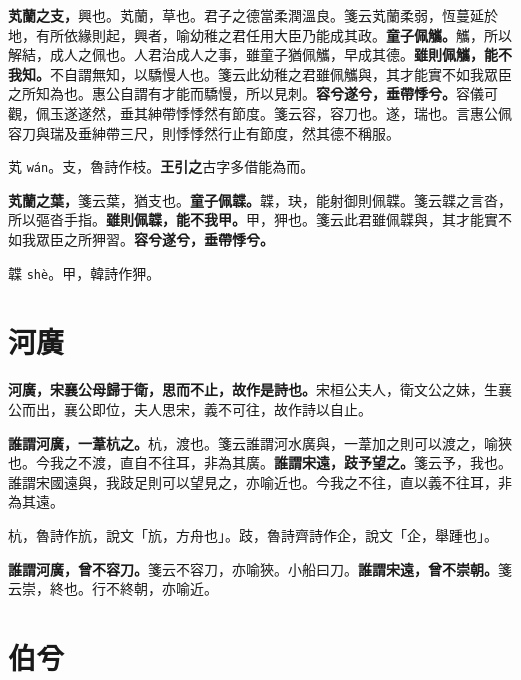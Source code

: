 \textbf{芄蘭之支，}{\footnotesize 興也。芄蘭，草也。君子之德當柔潤溫良。箋云芄蘭柔弱，恆蔓延於地，有所依緣則起，興者，喻幼稚之君任用大臣乃能成其政。}\textbf{童子佩觿。}{\footnotesize 觿，所以解結，成人之佩也。人君治成人之事，雖童子猶佩觿，早成其德。}\textbf{雖則佩觿，能不我知。}{\footnotesize 不自謂無知，以驕慢人也。箋云此幼稚之君雖佩觿與，其才能實不如我眾臣之所知為也。惠公自謂有才能而驕慢，所以見刺。}\textbf{容兮遂兮，垂帶悸兮。}{\footnotesize 容儀可觀，佩玉遂遂然，垂其紳帶悸悸然有節度。箋云容，容刀也。遂，瑞也。言惠公佩容刀與瑞及垂紳帶三尺，則悸悸然行止有節度，然其德不稱服。}

\begin{quoting}芄 \texttt{wán}。支，魯詩作枝。\textbf{王引之}古字多借能為而。\end{quoting}

\textbf{芄蘭之葉，}{\footnotesize 箋云葉，猶支也。}\textbf{童子佩韘。}{\footnotesize 韘，玦，能射御則佩韘。箋云韘之言沓，所以彄沓手指。}\textbf{雖則佩韘，能不我甲。}{\footnotesize 甲，狎也。箋云此君雖佩韘與，其才能實不如我眾臣之所狎習。}\textbf{容兮遂兮，垂帶悸兮。}

\begin{quoting}韘 \texttt{shè}。甲，韓詩作狎。\end{quoting}

\section{河廣}


\textbf{河廣，宋襄公母歸于衛，思而不止，故作是詩也。}{\footnotesize 宋桓公夫人，衛文公之妹，生襄公而出，襄公即位，夫人思宋，義不可往，故作詩以自止。}

\textbf{誰謂河廣，一葦杭之。}{\footnotesize 杭，渡也。箋云誰謂河水廣與，一葦加之則可以渡之，喻狹也。今我之不渡，直自不往耳，非為其廣。}\textbf{誰謂宋遠，跂予望之。}{\footnotesize 箋云予，我也。誰謂宋國遠與，我跂足則可以望見之，亦喻近也。今我之不往，直以義不往耳，非為其遠。}

\begin{quoting}杭，魯詩作斻，說文「斻，方舟也」。跂，魯詩齊詩作企，說文「企，舉踵也」。\end{quoting}

\textbf{誰謂河廣，曾不容刀。}{\footnotesize 箋云不容刀，亦喻狹。小船曰刀。}\textbf{誰謂宋遠，曾不崇朝。}{\footnotesize 箋云崇，終也。行不終朝，亦喻近。}

\section{伯兮}


